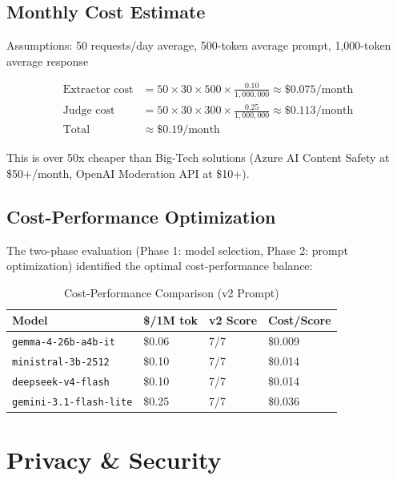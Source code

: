 \documentclass[11pt,a4paper]{article}
\begin{document}
\subsection{Monthly Cost Estimate}

Assumptions: 50 requests/day average, 500-token average prompt, 1,000-token average response

\begin{align*}
\text{Extractor cost} &= 50 \times 30 \times 500 \times \frac{0.10}{1{,}000{,}000} \approx \$0.075/\text{month} \\
\text{Judge cost} &= 50 \times 30 \times 300 \times \frac{0.25}{1{,}000{,}000} \approx \$0.113/\text{month} \\
\text{Total} &\approx \$0.19/\text{month}
\end{align*}

This is over 50x cheaper than Big-Tech solutions (Azure AI Content Safety at \$50+/month, OpenAI Moderation API at \$10+).

\subsection{Cost-Performance Optimization}

The two-phase evaluation (Phase 1: model selection, Phase 2: prompt optimization) identified the optimal cost-performance balance:

\begin{table}[h]
\centering
\begin{tabular}{@{}llll@{}}
\toprule
Model & \$/1M tok & v2 Score & Cost/Score \\
\midrule
\texttt{gemma-4-26b-a4b-it} & \$0.06 & 7/7 & \$0.009 \\
\texttt{ministral-3b-2512} & \$0.10 & 7/7 & \$0.014 \\
\texttt{deepseek-v4-flash} & \$0.10 & 7/7 & \$0.014 \\
\texttt{gemini-3.1-flash-lite} & \$0.25 & 7/7 & \$0.036 \\
\bottomrule
\end{tabular}
\caption{Cost-Performance Comparison (v2 Prompt)}
\end{table}

\section{Privacy \& Security}
\end{document}
